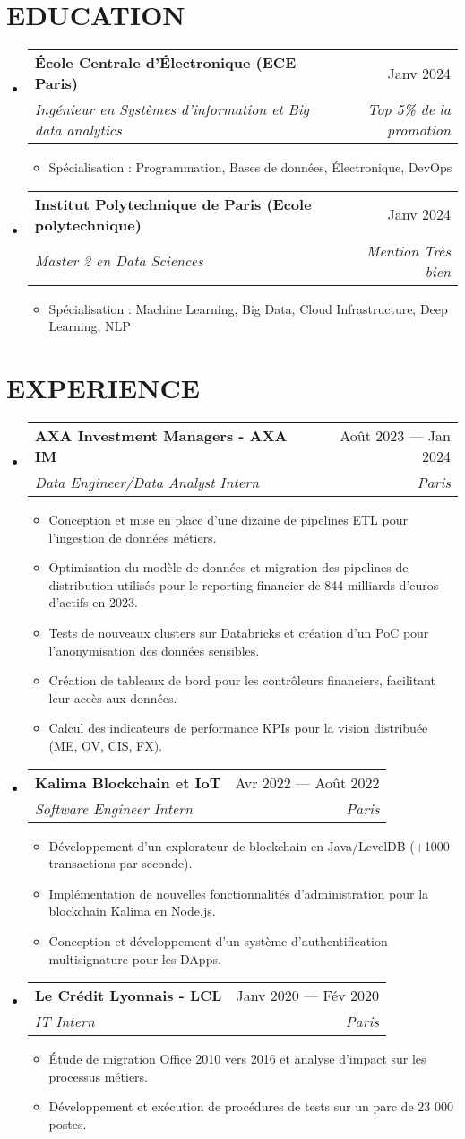 \documentclass[letterpaper,11pt]{article}
\makeatletter
\newcommand{\resumeItem}[1]{
  \item\small{
    {#1 \vspace{-1pt}}
  }
}
\newcommand{\resumeSubheading}[4]{
  \vspace{-1pt}\item
    \begin{tabular*}{\textwidth}[t]{l@{\extracolsep{\fill}}r}
      \textbf{#1} & #2 \\
      \textit{#3} & \textit{#4} \\
    \end{tabular*}\vspace{-4pt}
}
\newcommand{\resumeSubHeadingListStart}{\begin{itemize}[leftmargin=0in, label={}]}
\newcommand{\resumeSubHeadingListEnd}{\end{itemize}}
\newcommand{\resumeItemListStart}{\begin{itemize}[label={\textbullet}]}
\newcommand{\resumeItemListEnd}{\end{itemize}\vspace{0pt}}
\makeatother
\begin{document}
\section{EDUCATION}
\resumeSubHeadingListStart
    \resumeSubheading
      {École Centrale d'Électronique (ECE Paris)}
      {Janv 2024}
      {Ingénieur en Systèmes d'information et Big data analytics}
      {Top 5\% de la promotion}
      \resumeItemListStart
        \resumeItem{Spécialisation : Programmation, Bases de données, Électronique, DevOps}
      \resumeItemListEnd
    \resumeSubheading
      {Institut Polytechnique de Paris (Ecole polytechnique)}
      {Janv 2024}
      {Master 2 en Data Sciences}
      {Mention Très bien}
      \resumeItemListStart
        \resumeItem{Spécialisation : Machine Learning, Big Data, Cloud Infrastructure, Deep Learning, NLP}
      \resumeItemListEnd
  \resumeSubHeadingListEnd

\section{EXPERIENCE}
\resumeSubHeadingListStart
    \resumeSubheading
      {AXA Investment Managers - AXA IM}{Août 2023 --- Jan 2024}
      {Data Engineer/Data Analyst Intern}{Paris}
      \resumeItemListStart
        \resumeItem{Conception et mise en place d'une dizaine de pipelines ETL pour l'ingestion de données métiers.}
        \resumeItem{Optimisation du modèle de données et migration des pipelines de distribution utilisés pour le reporting financier de 844 milliards d'euros d'actifs en 2023.}
        \resumeItem{Tests de nouveaux clusters sur Databricks et création d'un PoC pour l'anonymisation des données sensibles.}
        \resumeItem{Création de tableaux de bord pour les contrôleurs financiers, facilitant leur accès aux données.}
        \resumeItem{Calcul des indicateurs de performance KPIs pour la vision distribuée (ME, OV, CIS, FX).}
      \resumeItemListEnd
    \resumeSubheading
      {Kalima Blockchain et IoT}{Avr 2022 --- Août 2022}
      {Software Engineer Intern}{Paris}
      \resumeItemListStart
        \resumeItem{Développement d'un explorateur de blockchain en Java/LevelDB (+1000 transactions par seconde).}
        \resumeItem{Implémentation de nouvelles fonctionnalités d'administration pour la blockchain Kalima en Node.js.}
        \resumeItem{Conception et développement d'un système d'authentification multisignature pour les DApps.}
      \resumeItemListEnd
    \resumeSubheading
      {Le Crédit Lyonnais - LCL}{Janv 2020 --- Fév 2020}
      {IT Intern}{Paris}
      \resumeItemListStart
        \resumeItem{Étude de migration Office 2010 vers 2016 et analyse d'impact sur les processus métiers.}
        \resumeItem{Développement et exécution de procédures de tests sur un parc de 23 000 postes.}
      \resumeItemListEnd
  \resumeSubHeadingListEnd
\end{document}
